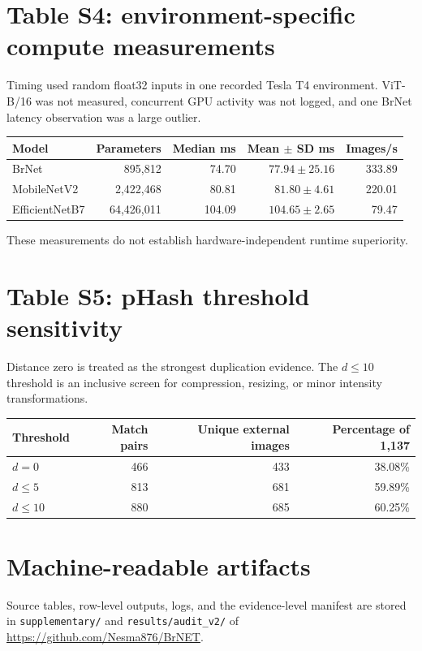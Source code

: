 \documentclass[10pt]{article}
\begin{document}
\section*{Table S4: environment-specific compute measurements}
Timing used random float32 inputs in one recorded Tesla T4 environment. ViT-B/16 was not measured, concurrent GPU activity was not logged, and one BrNet latency observation was a large outlier.
\begin{center}
\begin{tabular}{lrrrr}
\toprule
Model & Parameters & Median ms & Mean $\pm$ SD ms & Images/s\\
\midrule
BrNet&895,812&74.70&$77.94\pm25.16$&333.89\\
MobileNetV2&2,422,468&80.81&$81.80\pm4.61$&220.01\\
EfficientNetB7&64,426,011&104.09&$104.65\pm2.65$&79.47\\
\bottomrule
\end{tabular}
\end{center}
These measurements do not establish hardware-independent runtime superiority.

\section*{Table S5: pHash threshold sensitivity}
Distance zero is treated as the strongest duplication evidence. The $d\leq10$ threshold is an inclusive screen for compression, resizing, or minor intensity transformations.
\begin{center}
\begin{tabular}{lrrr}
\toprule
Threshold & Match pairs & Unique external images & Percentage of 1,137\\
\midrule
$d=0$&466&433&38.08\%\\
$d\leq5$&813&681&59.89\%\\
$d\leq10$&880&685&60.25\%\\
\bottomrule
\end{tabular}
\end{center}

\section*{Machine-readable artifacts}
Source tables, row-level outputs, logs, and the evidence-level manifest are stored in \texttt{supplementary/} and \texttt{results/audit\_v2/} of \url{https://github.com/Nesma876/BrNET}.
\end{document}
